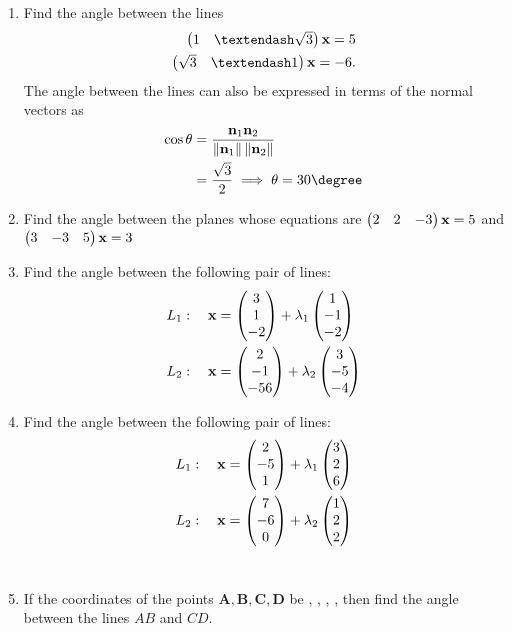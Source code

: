 \documentclass[journal,12pt,twocolumn]{IEEEtran}
\renewcommand\thesection{\arabic{section}}
\begin{document}
\begin{enumerate}[label=\thesection.\arabic*.,ref=\thesection.\theenumi]
\item Find the angle between the lines 
%
\begin{align}
\myvec{1 & – \sqrt{3}}\vec{x}  = 5
\\
\myvec{\sqrt{3} & –1}\vec{x}  = -6
. 
\end{align}
%
\solution The angle between the lines can also be expressed in terms of the normal vectors as
%
\begin{align}
\cos \theta &= \frac{\vec{n}_1\vec{n}_2}{\norm{\vec{n}_1}\norm{\vec{n}_2}}
\\
&= \frac{\sqrt{3}}{2} \implies \theta = 30\degree
\end{align}
%
\item Find the angle between the planes whose equations are
$
\begin{pmatrix}2 & 2 & -3\end{pmatrix}\mathbf{x}=5
$
 and 
$
\begin{pmatrix}3 & -3 & 5\end{pmatrix}\mathbf{x}=3
$
\\
\solution

\item Find the angle between the following pair of lines:
\begin{align}
    L_1: \quad \mathbf{x} &= \begin{pmatrix}3\\1\\-2\end{pmatrix} + \lambda_1\begin{pmatrix}1 \\ -1 \\-2\end{pmatrix} \label{aug/22/eq:1} \\
    L_2: \quad \mathbf{x} &= \begin{pmatrix}2\\-1\\-56\end{pmatrix} + \lambda_2\begin{pmatrix}3 \\ -5 \\-4\end{pmatrix} \label{aug/22/eq:2}
    \end{align}
\solution

\item Find the angle between the following pair of lines:
\begin{align}
L_1: \quad \mathbf{x} &= \begin{pmatrix}2\\-5\\1\end{pmatrix} + \lambda_1\begin{pmatrix}3 \\ 2 \\6\end{pmatrix}
\\
L_2: \quad \mathbf{x} &= \begin{pmatrix}7\\-6\\0\end{pmatrix} + \lambda_2\begin{pmatrix}1 \\ 2 \\2\end{pmatrix}
\end{align}
\\
\solution

\item If the coordinates of the points $\bm{A}, \bm{B}, \bm{C}, \bm{D}$ be , , , , then find the angle between the lines $AB$ and $CD$.  
%
\\
\solution
%
\end{enumerate}
\end{document}
